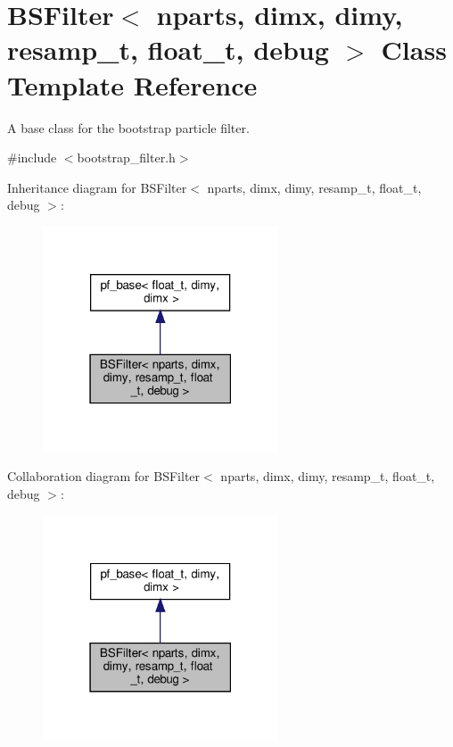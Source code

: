\hypertarget{classBSFilter}{}\section{B\+S\+Filter$<$ nparts, dimx, dimy, resamp\+\_\+t, float\+\_\+t, debug $>$ Class Template Reference}
\label{classBSFilter}


A base class for the bootstrap particle filter.  




{\ttfamily \#include $<$bootstrap\+\_\+filter.\+h$>$}



Inheritance diagram for B\+S\+Filter$<$ nparts, dimx, dimy, resamp\+\_\+t, float\+\_\+t, debug $>$\+:\nopagebreak
\begin{figure}[H]
\begin{center}
\leavevmode
\includegraphics[width=198pt]{classBSFilter__inherit__graph}
\end{center}
\end{figure}


Collaboration diagram for B\+S\+Filter$<$ nparts, dimx, dimy, resamp\+\_\+t, float\+\_\+t, debug $>$\+:\nopagebreak
\begin{figure}[H]
\begin{center}
\leavevmode
\includegraphics[width=198pt]{classBSFilter__coll__graph}
\end{center}
\end{figure}
